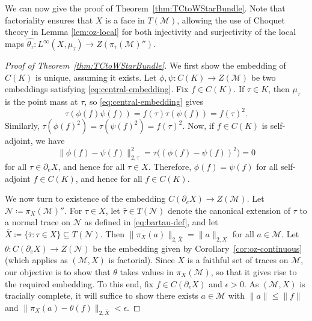 \documentclass[a4paper,11pt]{amsart}
\theoremstyle{definition}
\numberwithin{equation}{section}
\numberwithin{theorem}{section}
\newcommand{\M}{\mathcal{M}}
\begin{document}
We can now give the proof of Theorem~\ref{thm:TCtoWStarBundle}.  Note that factoriality ensures that $X$ is a face in $T(\M)$, allowing the use of Choquet theory in Lemma \ref{lem:oz-local} for both injectivity and surjectivity of the local maps $\hat{\theta_\tau}\colon L^\infty(X,\mu_\tau)\to Z(\pi_\tau(\M)'')$.



\begin{proof}[Proof of Theorem~\ref{thm:TCtoWStarBundle}]
	We first show the embedding of $C(K)$ is unique, assuming it exists.  Let $\phi, \psi \colon C(K) \rightarrow Z(\mathcal M)$ be two embeddings satisfying \eqref{eq:central-embedding}.  Fix $f \in C(K)$.  If $\tau \in K$, then $\mu_\tau$ is the point mass at $\tau$, so \eqref{eq:central-embedding} gives
	\begin{equation}
		\tau(\phi(f) \psi(f)) = f(\tau) \tau(\psi(f)) = f(\tau)^2.
	\end{equation}
	Similarly, $\tau(\phi(f)^2) = \tau(\psi(f)^2) = f(\tau)^2$.  Now, if $f \in C(K)$ is self-adjoint, we have
	\begin{equation}
		\|\phi(f) - \psi(f)\|_{2, \tau}^2 = \tau\big((\phi(f) - \psi(f))^2\big) = 0
	\end{equation}
	for all $\tau \in \partial_e X$, and hence for all $\tau \in X$.  Therefore, $\phi(f) = \psi(f)$ for all self-adjoint $f \in C(K)$, and hence for all $f \in C(K)$.


We now turn to existence of the embedding $C(\partial_e X) \rightarrow Z(\mathcal M)$.
Let $\mathcal N \coloneqq \pi_X(\mathcal M)''$.  For $\tau \in X$, let $\bar\tau \in T(\mathcal N)$ denote the canonical extension of $\tau$ to a normal trace on $\mathcal N$ as defined in \eqref{eq:bartau-def}, and let $\bar X \coloneqq \{\bar \tau : \tau \in X \} \subseteq T(\mathcal N)$.  Then $\|\pi_X(a)\|_{2, \bar X} = \|a\|_{2, X}$ for all $a \in \mathcal M$.  Let $\theta \colon C(\partial_e X) \rightarrow Z(\mathcal N)$ be the embedding given by Corollary~\ref{cor:oz-continuous} (which applies as $(\M,X)$ is factorial). Since $X$ is a faithful set of traces on $\M$, our objective is to show that $\theta$ takes values in $\pi_X(\M)$, so that it gives rise to the required embedding.  To this end, fix $f \in C(\partial_e X)$ and $\epsilon > 0$. As $(\M,X)$ is tracially complete, it will suffice to show there exists $a \in \mathcal M$ with $\|a\| \leq \|f\|$ and $\|\pi_X(a) - \theta(f)\|_{2, \bar X} < \epsilon$.


\end{proof}
\end{document}
